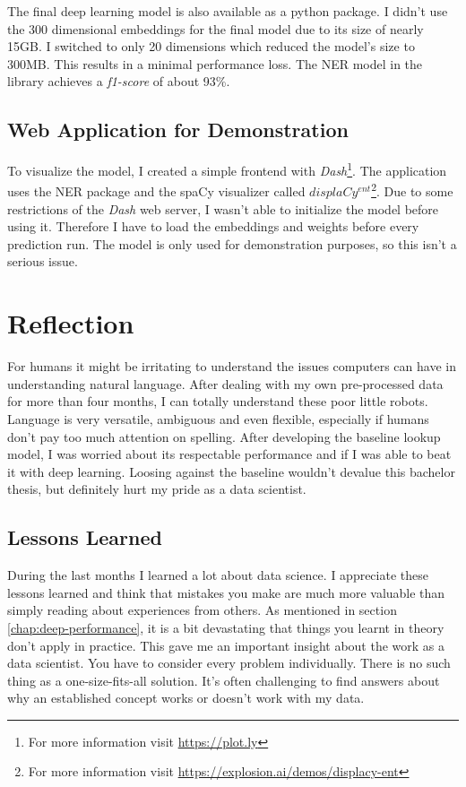 The final deep learning model is also available as a python package. I didn't use the 300 dimensional embeddings for the final model due to its size of nearly 15GB. I switched to only 20 dimensions which reduced the model's size to 300MB. This results in a minimal performance loss. The NER model in the library achieves a \emph{f1-score} of about 93\%.

\subsection{Web Application for Demonstration}

To visualize the model, I created a simple frontend with \emph{Dash}\footnote{For more information visit \url{https://plot.ly}}. The application uses the NER package and the spaCy visualizer called \emph{$displaCy^{ent}$}\footnote{For more information visit \url{https://explosion.ai/demos/displacy-ent}}. Due to some restrictions of the \emph{Dash} web server, I wasn't able to initialize the model before using it. Therefore I have to load the embeddings and weights before every prediction run. The model is only used for demonstration purposes, so this isn't a serious issue.

\section{Reflection}

For humans it might be irritating to understand the issues computers can have in understanding natural language. After dealing with my own pre-processed data for more than four months, I can totally understand these poor little robots. Language is very versatile, ambiguous and even flexible, especially if humans don't pay too much attention on spelling.
After developing the baseline lookup model, I was worried about its respectable performance and if I was able to beat it with deep learning. Loosing against the baseline wouldn't devalue this bachelor thesis, but definitely hurt my pride as a data scientist.

\subsection{Lessons Learned}

During the last months I learned a lot about data science. I appreciate these lessons learned and think that mistakes you make are much more valuable than simply reading about experiences from others. As mentioned in section \ref{chap:deep-performance}, it is a bit devastating that things you learnt in theory don't apply in practice. This gave me an important insight about the work as a data scientist. You have to consider every problem individually. There is no such thing as a one-size-fits-all solution. It's often challenging to find answers about why an established concept works or doesn't work with my data.

